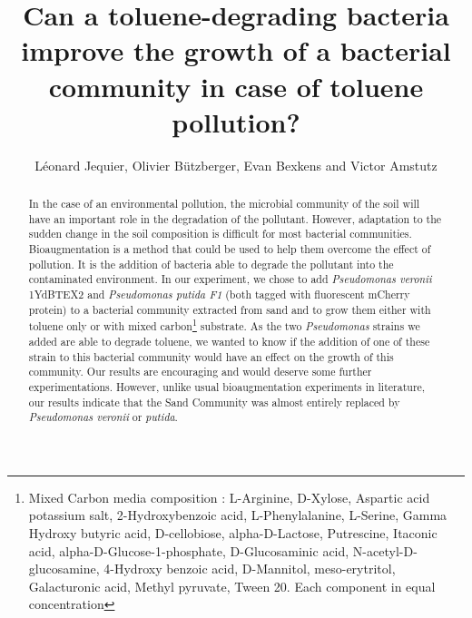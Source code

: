 \documentclass[a4paper, 10pt, conference]{ieeeconf}   %
\title{\LARGE \bf
Can a toluene-degrading bacteria improve the growth of a bacterial community in case of toluene pollution?
}
\author{Léonard Jequier, Olivier Bützberger, Evan Bexkens and Victor Amstutz%
}
\begin{document}
\vspace{-2cm}
\maketitle
\thispagestyle{plain}
\pagestyle{plain}

\begin{abstract}

	

In the case of an environmental pollution, the microbial community of the soil will have an important role in the degradation of the pollutant. However, adaptation to the sudden change in the soil composition is difficult for most bacterial communities. Bioaugmentation is a method that could be used to help them overcome the effect of pollution. It is the addition of bacteria able to degrade the pollutant into the contaminated environment. In our experiment, we chose to add \textit{Pseudomonas veronii} 1YdBTEX2 and \textit{Pseudomonas putida F1} (both tagged with fluorescent mCherry protein) to a bacterial community extracted from sand and to grow them either with toluene only or with mixed carbon\footnote{Mixed Carbon media composition : L-Arginine, D-Xylose, Aspartic acid potassium salt, 2-Hydroxybenzoic acid, L-Phenylalanine, L-Serine, Gamma Hydroxy butyric acid, D-cellobiose, alpha-D-Lactose, Putrescine, Itaconic acid, alpha-D-Glucose-1-phosphate, D-Glucosaminic acid, N-acetyl-D-glucosamine, 4-Hydroxy benzoic acid, D-Mannitol, meso-erytritol, Galacturonic acid, Methyl pyruvate, Tween 20. Each component in equal concentration} substrate. As the two \textit{Pseudomonas} strains we added are able to degrade toluene, we wanted to know if the addition of one of these strain to this bacterial community would have an effect on the growth of this community.
Our results are encouraging and would deserve some further experimentations. However, unlike usual bioaugmentation experiments in literature, our results indicate that the Sand Community was almost entirely replaced by \textit{Pseudomonas veronii} or \textit{putida}.


\end{abstract}
\end{document}

